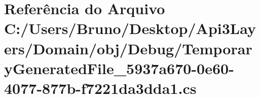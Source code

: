 \hypertarget{Domain_2obj_2Debug_2TemporaryGeneratedFile__5937a670-0e60-4077-877b-f7221da3dda1_8cs}{}\section{Referência do Arquivo C\+:/\+Users/\+Bruno/\+Desktop/\+Api3\+Layers/\+Domain/obj/\+Debug/\+Temporary\+Generated\+File\+\_\+5937a670-\/0e60-\/4077-\/877b-\/f7221da3dda1.cs}
\label{Domain_2obj_2Debug_2TemporaryGeneratedFile__5937a670-0e60-4077-877b-f7221da3dda1_8cs}
